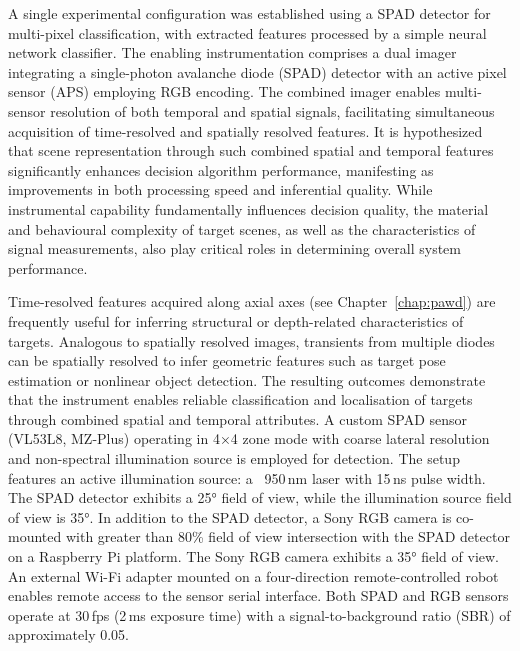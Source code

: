 \documentclass[12pt,a4paper,oneside]{report}
\begin{document}
A single experimental configuration was established using a SPAD detector for multi-pixel classification, with extracted features processed by a simple neural network classifier. The enabling instrumentation comprises a dual imager integrating a single-photon avalanche diode (SPAD) detector with an active pixel sensor (APS) employing RGB encoding. The combined imager enables multi-sensor resolution of both temporal and spatial signals, facilitating simultaneous acquisition of time-resolved and spatially resolved features. It is hypothesized that scene representation through such combined spatial and temporal features significantly enhances decision algorithm performance, manifesting as improvements in both processing speed and inferential quality. While instrumental capability fundamentally influences decision quality, the material and behavioural complexity of target scenes, as well as the characteristics of signal measurements, also play critical roles in determining overall system performance.

Time-resolved features acquired along axial axes (see Chapter~\ref{chap:pawd}) are frequently useful for inferring structural or depth-related characteristics of targets. Analogous to spatially resolved images, transients from multiple diodes can be spatially resolved to infer geometric features such as target pose estimation or nonlinear object detection. The resulting outcomes demonstrate that the instrument enables reliable classification and localisation of targets through combined spatial and temporal attributes. A custom SPAD sensor (VL53L8, MZ-Plus) operating in 4×4 zone mode with coarse lateral resolution and non-spectral illumination source is employed for detection. The setup features an active illumination source: a ~950\,nm laser with 15\,ns pulse width. The SPAD detector exhibits a 25° field of view, while the illumination source field of view is 35°. In addition to the SPAD detector, a Sony RGB camera is co-mounted with greater than 80\% field of view intersection with the SPAD detector on a Raspberry Pi platform. The Sony RGB camera exhibits a 35° field of view. An external Wi-Fi adapter mounted on a four-direction remote-controlled robot enables remote access to the sensor serial interface. Both SPAD and RGB sensors operate at 30\,fps (2\,ms exposure time) with a signal-to-background ratio (SBR) of approximately 0.05.
\end{document}
